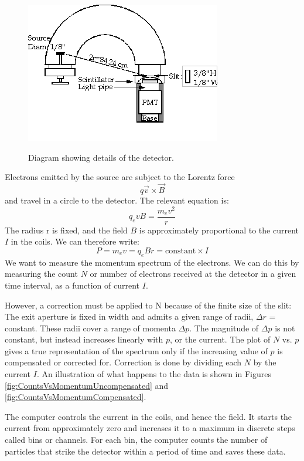 \documentclass{../lab}
\begin{document}
\begin{figure}[h]
    \centering
    \href{http://experimentationlab.berkeley.edu/sites/default/files/images/BRAimage011.gif}{\includegraphics[width=0.5\linewidth]{images/BRAimage011.png}}
    \caption{Diagram showing details of the detector.}
    \label{fig:BRAimage011}
\end{figure}

Electrons emitted by the source are subject to the Lorentz force
\begin{equation}
    q \vec{v} \times \vec {B}
\end{equation}
and travel in a circle to the detector. The relevant equation is:
\begin{equation}
    q_e v B = \frac {m_e v^2}{r}
\end{equation}
The radius r is fixed, and the field $B$ is approximately proportional to the current $I$ in the coils. We can therefore write:
\begin{equation}
    P = m_e v = q_e B r = \text{constant} \times I
\end{equation}
We want to measure the momentum spectrum of the electrons. We can do this by measuring the count $N$ or number of electrons received at the detector in a given time interval, as a function of current $I$.

However, a correction must be applied to N because of the finite size of the slit: The exit aperture is fixed in width and admits a given range of radii, $\Delta r$ = constant. These radii cover a range of momenta $\Delta p$. The magnitude of $\Delta p$ is not constant, but instead increases linearly with $p$, or the current. The plot of $N$ vs. $p$ gives a true representation of the spectrum only if the increasing value of $p$ is compensated or corrected for. Correction is done by dividing each $N$ by the current $I$. An illustration of what happens to the data is shown in Figures \ref{fig:CountsVsMomentumUncompensated} and \ref{fig:CountsVsMomentumCompensated}.

The computer controls the current in the coils, and hence the field. It starts the current from approximately zero and increases it to a maximum in discrete steps called bins or channels. For each bin, the computer counts the number of particles that strike the detector within a period of time and saves these data.
\end{document}
